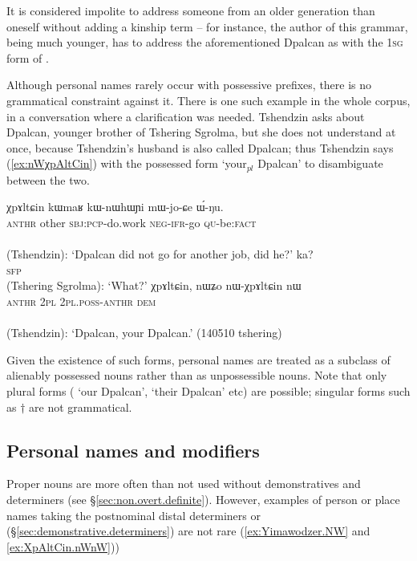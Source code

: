It is considered impolite to address someone from an older generation than oneself without adding a kinship term -- for instance, the author of this grammar, being much younger, has to address the aforementioned Dpalcan as  with the \textsc{1sg} form of .

Although personal names rarely occur with possessive prefixes, there is no grammatical constraint against it. There is one such example in the whole corpus, in a conversation where a clarification was needed. Tshendzin asks about Dpalcan, younger brother of Tshering Sgrolma, but she does not understand at once, because Tshendzin's husband is also called Dpalcan; thus Tshendzin says (\ref{ex:nWχpAltCin}) with the possessed form  `your$_{pl}$ Dpalcan' to disambiguate between the two. 

\begin{exe}
\ex   
\begin{xlist}
\ex 
\gll χpɤltɕin kɯmaʁ kɯ-nɯhɯɲi mɯ-jo-ɕe ɯ́-ŋu. \\
\textsc{anthr} other \textsc{sbj}:\textsc{pcp}-do.work \textsc{neg}-\textsc{ifr}-go \textsc{qu}-be:\textsc{fact} \\
\\
\glt (Tshendzin): `Dpalcan did not go for another job, did he?'
\ex 
\gll ka? \\
\textsc{sfp} \\
\glt  (Tshering Sgrolma): `What?'
\ex  \label{ex:nWχpAltCin}
\gll χpɤltɕin, nɯʑo nɯ-χpɤltɕin nɯ \\
\textsc{anthr} \textsc{2pl} \textsc{2pl}.\textsc{poss}-\textsc{anthr} \textsc{dem} \\
\\
\glt (Tshendzin): `Dpalcan, your Dpalcan.'   (140510 tshering)
\end{xlist}
\end{exe}

Given the existence of such forms, personal names are treated as a subclass of alienably possessed nouns rather than as unpossessible nouns. Note that only plural forms ( `our Dpalcan',  `their Dpalcan' etc) are possible; singular forms such as $\dagger$ are not grammatical.

\subsection{Personal names and modifiers} \label{sec:personal.names.modifiers}
Proper nouns are more often than not used without demonstratives and determiners (see §\ref{sec:non.overt.definite}). However, examples of person or place names taking the postnominal distal determiners  or  (§\ref{sec:demonstrative.determiners}) are not rare (\ref{ex:Yimawodzer.NW} and \ref{ex:XpAltCin.nWnW}))

